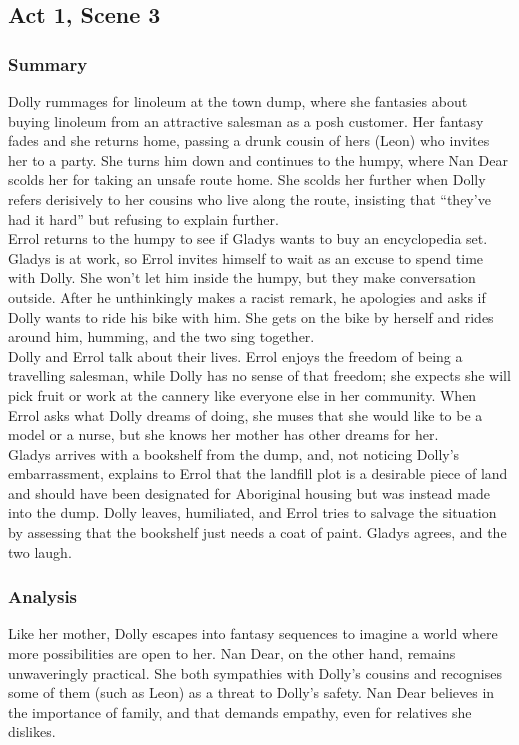\documentclass[a4paper]{article}
\begin{document}
\subsection{Act 1, Scene 3}
\subsubsection{Summary}
Dolly rummages for linoleum at the town dump, where she
fantasies about buying linoleum from an attractive salesman
as a posh customer. Her fantasy fades and she returns home,
passing a drunk cousin of hers (Leon) who invites her to a party.
She turns him down and continues to the humpy, where Nan
Dear scolds her for taking an unsafe route home. She scolds
her further when Dolly refers derisively to her cousins who live
along the route, insisting that “they’ve had it hard” but refusing
to explain further.\\

Errol returns to the humpy to see if Gladys wants to buy an
encyclopedia set. Gladys is at work, so Errol invites himself to
wait as an excuse to spend time with Dolly. She won’t let him
inside the humpy, but they make conversation outside. After he
unthinkingly makes a racist remark, he apologies and asks if
Dolly wants to ride his bike with him. She gets on the bike by
herself and rides around him, humming, and the two sing
together.\\

Dolly and Errol talk about their lives. Errol enjoys the freedom
of being a travelling salesman, while Dolly has no sense of that
freedom; she expects she will pick fruit or work at the cannery
like everyone else in her community. When Errol asks what
Dolly dreams of doing, she muses that she would like to be a
model or a nurse, but she knows her mother has other dreams
for her.\\

Gladys arrives with a bookshelf from the dump, and, not
noticing Dolly’s embarrassment, explains to Errol that the
landfill plot is a desirable piece of land and should have been
designated for Aboriginal housing but was instead made into
the dump. Dolly leaves, humiliated, and Errol tries to salvage
the situation by assessing that the bookshelf just needs a coat
of paint. Gladys agrees, and the two laugh.\\

\subsubsection{Analysis}
Like her mother, Dolly escapes into fantasy sequences to imagine a
world where more possibilities are open to her. Nan Dear, on the
other hand, remains unwaveringly practical. She both sympathies
with Dolly’s cousins and recognises some of them (such as Leon) as
a threat to Dolly’s safety. Nan Dear believes in the importance of
family, and that demands empathy, even for relatives she dislikes.\\
\end{document}
